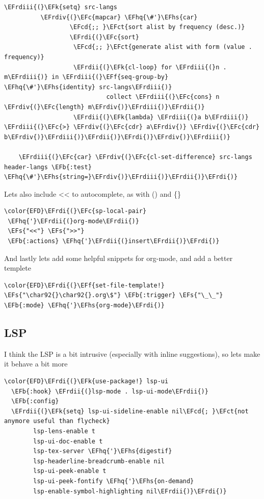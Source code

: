 \documentclass{scrartcl}
\newcommand{\EFk}[1]{\textcolor{EFk}{#1}} %
\newcommand{\EFs}[1]{\textcolor{EFs}{#1}} %
\newcommand{\EFb}[1]{\textcolor{EFb}{#1}} %
\newcommand{\EFct}[1]{\textcolor{EFct}{#1}} %
\newcommand{\EFc}[1]{\textcolor{EFc}{#1}} %
\newcommand{\EFf}[1]{\textcolor{EFf}{#1}} %
\newcommand{\EFcd}[1]{\textcolor{EFcd}{#1}} %
\newcommand{\EFhq}[1]{#1} %
\newcommand{\EFhs}[1]{#1} %
\newcommand{\EFrdi}[1]{#1} %
\newcommand{\EFrdii}[1]{#1} %
\newcommand{\EFrdiii}[1]{#1} %
\newcommand{\EFrdiv}[1]{#1} %
\begin{document}
\begin{Code}
\begin{Verbatim}[]
    \EFrdiii{(}\EFk{setq} src-langs
          \EFrdiv{(}\EFc{mapcar} \EFhq{\#'}\EFhs{car}
                  \EFcd{;; }\EFct{sort alist by frequency (desc.)}
                  \EFrdi{(}\EFc{sort}
                   \EFcd{;; }\EFct{generate alist with form (value . frequency)}
                   \EFrdii{(}\EFk{cl-loop} for \EFrdiii{(}n . m\EFrdiii{)} in \EFrdiii{(}\EFf{seq-group-by} \EFhq{\#'}\EFhs{identity} src-langs\EFrdiii{)}
                            collect \EFrdiii{(}\EFc{cons} n \EFrdiv{(}\EFc{length} m\EFrdiv{)}\EFrdiii{)}\EFrdii{)}
                   \EFrdii{(}\EFk{lambda} \EFrdiii{(}a b\EFrdiii{)} \EFrdiii{(}\EFc{>} \EFrdiv{(}\EFc{cdr} a\EFrdiv{)} \EFrdiv{(}\EFc{cdr} b\EFrdiv{)}\EFrdiii{)}\EFrdii{)}\EFrdi{)}\EFrdiv{)}\EFrdiii{)}

    \EFrdiii{(}\EFc{car} \EFrdiv{(}\EFc{cl-set-difference} src-langs header-langs \EFb{:test} \EFhq{\#'}\EFhs{string=}\EFrdiv{)}\EFrdiii{)}\EFrdii{)}\EFrdi{)}
\end{Verbatim}
\end{Code}

Lets also include << to autocomplete, as with () and \{\}
\begin{Code}
\begin{Verbatim}[]
\color{EFD}\EFrdi{(}\EFc{sp-local-pair}
 \EFhq{'}\EFrdii{(}org-mode\EFrdii{)}
 \EFs{"<<"} \EFs{">>"}
 \EFb{:actions} \EFhq{'}\EFrdii{(}insert\EFrdii{)}\EFrdi{)}
\end{Verbatim}
\end{Code}

And lastly lets add some helpful snippets for org-mode, and add a better templete
\begin{Code}
\begin{Verbatim}[]
\color{EFD}\EFrdi{(}\EFf{set-file-template!} \EFs{"\char92{}\char92{}.org\$"} \EFb{:trigger} \EFs{"\_\_"} \EFb{:mode} \EFhq{'}\EFhs{org-mode}\EFrdi{)}
\end{Verbatim}
\end{Code}

\subsection{LSP}
\label{sec:orgc94361c}
I think the LSP is a bit intrusive (especially with inline suggestions), so lets make it behave a bit more
\begin{Code}
\begin{Verbatim}[]
\color{EFD}\EFrdi{(}\EFk{use-package!} lsp-ui
  \EFb{:hook} \EFrdii{(}lsp-mode . lsp-ui-mode\EFrdii{)}
  \EFb{:config}
  \EFrdii{(}\EFk{setq} lsp-ui-sideline-enable nil\EFcd{; }\EFct{not anymore useful than flycheck}
        lsp-lens-enable t
        lsp-ui-doc-enable t
        lsp-tex-server \EFhq{'}\EFhs{digestif}
        lsp-headerline-breadcrumb-enable nil
        lsp-ui-peek-enable t
        lsp-ui-peek-fontify \EFhq{'}\EFhs{on-demand}
        lsp-enable-symbol-highlighting nil\EFrdii{)}\EFrdi{)}
\end{Verbatim}
\end{Code}
\end{document}
